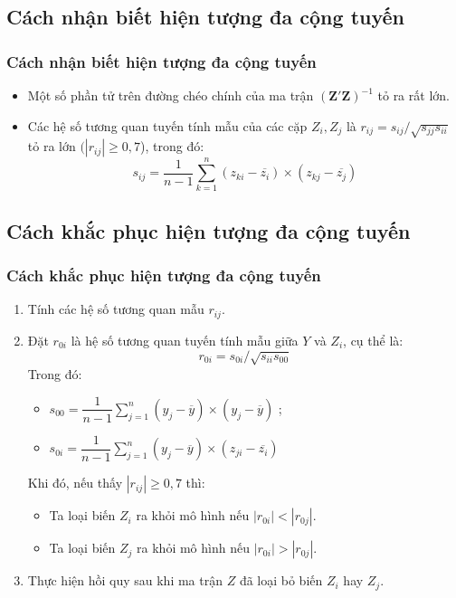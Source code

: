\subsection{Cách nhận biết hiện tượng đa cộng tuyến}
\begin{frame}
\frametitle{Cách nhận biết hiện tượng đa cộng tuyến}
\begin{itemize}
    \item Một số phần tử trên đường chéo chính của ma trận $(\textbf{Z}'\textbf{Z})^{-1}$ tỏ ra rất lớn.
    \item Các hệ số tương quan tuyến tính mẫu của các cặp $Z_i,Z_j$ là $r_{ij} = s_{ij}/\sqrt{s_{jj}s_{ii}}$ tỏ ra lớn $(|r_{ij}|\geq 0,7$), trong đó:
    $$s_{ij} = \dfrac{1}{n - 1}\sum\limits_{k=1}^n{(z_{ki} - \overline{z_i})  \times (z_{kj} -\overline{z_j})}$$
\end{itemize}
\end{frame}
\subsection{Cách khắc phục hiện tượng đa cộng tuyến}
\begin{frame}
\frametitle{Cách khắc phục hiện tượng đa cộng tuyến}
\begin{enumerate}
    \item Tính các hệ số tương quan mẫu $r_{ij}$.
	\item Đặt $r_{0i}$ là hệ số tương quan tuyến tính mẫu giữa $Y$ và $Z_i$, cụ thể là:
	$$r_{0i} = s_{0i}/\sqrt{s_{ii}s_{00}}$$
	Trong đó:
    \begin{itemize}
    \item $s_{00} = \dfrac{1}{n-1}\sum\limits_{j=1}^n{(y_j - \overline{y}) \times( y_j-\overline{y}) }$ ; \item $s_{0i} = \dfrac{1}{n-1}\sum\limits_{j=1}^n{(y_j - \overline{y}) \times( z_{ji}-\overline{z_i}) }$ \end{itemize}
	Khi đó, nếu thấy $|r_{ij}| \geq 0,7$ thì:
	\begin{itemize}
	    \item Ta loại biến $Z_i$ ra khỏi mô hình nếu $|r_{0i}| < |r_{0j}|$.
	    \item Ta loại biến $Z_j$ ra khỏi mô hình nếu $|r_{0i}| > |r_{0j}|$.
	\end{itemize} 
	\item Thực hiện hồi quy sau khi ma trận $Z$ đã loại bỏ biến $Z_i$ hay $Z_j$.
\end{enumerate}
\end{frame}